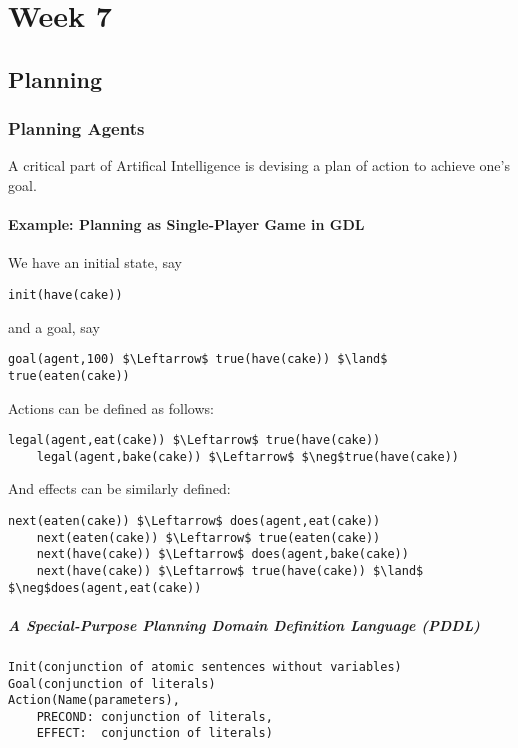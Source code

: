 \part{Week 7}
\chapter{Planning}

\section{Planning Agents}
A critical part of Artifical Intelligence is devising a plan of action to
achieve one's goal.

\subsection{Example: Planning as Single-Player Game in GDL}
We have an initial state, say
\begin{lstlisting}[morekeywords={init}]
    init(have(cake))
\end{lstlisting}

and a goal, say
\begin{lstlisting}[morekeywords={goal,true}]
    goal(agent,100) $\Leftarrow$ true(have(cake)) $\land$ true(eaten(cake))
\end{lstlisting}

Actions can be defined as follows:
\begin{lstlisting}[morekeywords={legal,true}]
    legal(agent,eat(cake)) $\Leftarrow$ true(have(cake))
    legal(agent,bake(cake)) $\Leftarrow$ $\neg$true(have(cake))
\end{lstlisting}

And effects can be similarly defined:
\begin{lstlisting}[morekeywords={next,does,true}]
    next(eaten(cake)) $\Leftarrow$ does(agent,eat(cake))
    next(eaten(cake)) $\Leftarrow$ true(eaten(cake))
    next(have(cake)) $\Leftarrow$ does(agent,bake(cake))
    next(have(cake)) $\Leftarrow$ true(have(cake)) $\land$ $\neg$does(agent,eat(cake))
\end{lstlisting}

\subsubsection{A Special-Purpose Planning Domain Definition Language (PDDL)}
\begin{lstlisting}[morekeywords={Init,Goal,Action}]
Init(conjunction of atomic sentences without variables)
Goal(conjunction of literals)
Action(Name(parameters),
    PRECOND: conjunction of literals,
    EFFECT:  conjunction of literals)
\end{lstlisting}

